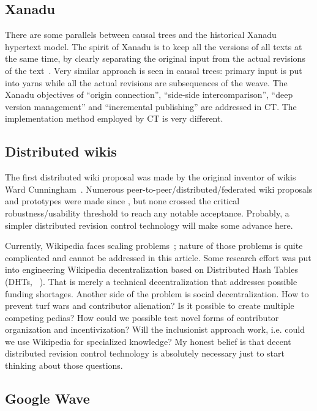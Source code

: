 \documentclass{acm_proc_article-sp}
\begin{document}
\subsection{Xanadu}

There are some parallels between causal trees and the historical Xanadu hypertext model.
The spirit of Xanadu is to keep all the versions of all texts at the same time, by clearly separating the original input from the actual revisions of the text~\cite{xanacarpet}.
Very similar  approach is seen in causal trees: primary input is put into yarns while all the actual revisions are subsequences of the weave.
The Xanadu objectives of ``origin connection'', ``side-side intercomparison'', ``deep version management'' and ``incremental publishing'' are addressed in CT.
The implementation method employed by CT is very different.

\subsection{Distributed wikis}

The first distributed wiki proposal was made by the original inventor of wikis Ward Cunningham~\cite{folk-memory}.
Numerous peer-to-peer/distributed/federated wiki proposals and prototypes were made since \cite{www06,buraga,distriwiki,concerto}, but none crossed the critical robustness/usability threshold to reach any notable acceptance. Probably, a simpler distributed revision control technology will make some advance here.

Currently, Wikipedia faces scaling problems~\cite{wp-decay,no-singularity}; nature of those problems is quite complicated and cannot be addressed in this article.
Some research effort was put into engineering Wikipedia decentralization based on Distributed Hash Tables (DHTs, ~\cite{urdaneta}).
That is merely a technical decentralization that addresses possible funding shortages.
Another side of the problem is social decentralization.
How to prevent turf wars and contributor alienation?
Is it possible to create multiple competing pedias?
How could we possible test novel forms of contributor organization and incentivization?
Will the inclusionist approach work, i.e. could we use Wikipedia for specialized knowledge?
My honest belief is that decent distributed revision control technology is absolutely necessary just to start thinking about those questions.


\subsection{Google Wave}  \label{sec:waveot}
\end{document}
